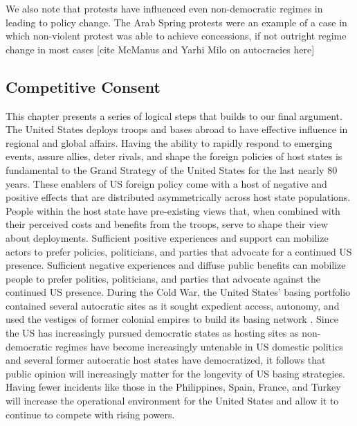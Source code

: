 {	%

	We also note that protests have influenced even non-democratic regimes in leading to policy change. The Arab Spring protests were an example of a case in which non-violent protest was able to achieve concessions, if not outright regime change in most cases \cite{Chenoweth2013} [cite McManus and Yarhi Milo on autocracies here]
	
\subsection*{Competitive Consent}
	
	This chapter presents a series of logical steps that builds to our final argument. The United States deploys troops and bases abroad to have effective influence in regional and global affairs. Having the ability to rapidly respond to emerging events, assure allies, deter rivals, and shape the foreign policies of host states is fundamental to the Grand Strategy of the United States for the last nearly 80 years. These enablers of US foreign policy come with a host of negative and positive effects that are distributed asymmetrically across host state populations. People within the host state have pre-existing views that, when combined with their perceived costs and benefits from the troops, serve to shape their view about deployments. Sufficient positive experiences and support can mobilize actors to prefer policies, politicians, and parties that advocate for a continued US presence. Sufficient negative experiences and diffuse public benefits can mobilize people to prefer polities, politicians, and parties that advocate against the continued US presence. During the Cold War, the United States' basing portfolio contained several autocratic sites as it sought expedient access, autonomy, and used the vestiges of former colonial empires to build its basing network \cite{calder2007,Harkavy2013}. Since the US has increasingly pursued democratic states as hosting sites as non-democratic regimes have become increasingly untenable in US domestic politics and several former autocratic host states have democratized, it follows that public opinion will increasingly matter for the longevity of US basing strategies. Having fewer incidents like those in the Philippines, Spain, France, and Turkey will increase the operational environment for the United States and allow it to continue to compete with rising powers. 
	
}

